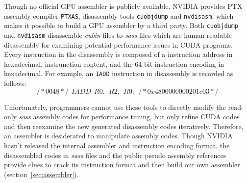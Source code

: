 Though no official GPU assembler is publicly available, 
NVIDIA provides PTX assembly compiler {\tt PTXAS}, disassembly tools {\tt cuobjdump} and {\tt nvdisasm}, which makes it possible to build a GPU assembler by a third party.
Both {\tt cuobjdump} and {\tt nvdisasm} disassemble {\em cubin} files to {\em sass} files which are human-readable disassembly for examining potential performance issues in CUDA programs. 
Every instruction in the disassembly is composed of a instruction address
in hexadecimal, instrunction content, and the 64-bit instruction encoding in hexadecimal. 
For example, an {\tt IADD} instruction in disassembly is recorded as follows:
{\footnotesize
\begin{equation}
\label{eq:iadd}
/*0048*/~~IADD~~R0,~~R2,~~R0;~~/*0x4800000000201c03*/
\end{equation}
}

Unfortunately, programmers cannot use these tools to directly modify the read-only {\em sass} assembly codes for performance tuning, but only refine CUDA codes and then reexamine the new generated disassembly codes iteratively.
Therefore, an assembler is desiderated to manipulate assembly codes. 
Though NVIDIA hasn't released the internal assembler and instruction encoding format, the disassembled codes in {\em sass} files and the public pseudo assembly references~\cite{ptx2015isa} provide clues to crack its instruction format and then build our own assembler (section~\ref{sec:assembler}).

